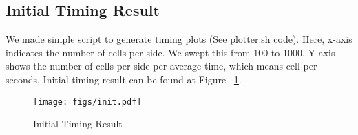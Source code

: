 \subsection{Initial Timing Result}
We made simple script to generate timing plots (See plotter.sh code). Here, x-axis indicates the number of cells per side. We swept this from 100 to 1000. Y-axis shows the number of cells per side per average time, which means cell per seconds. Initial timing result can be found at Figure ~\ref{fig:initial_timing_result}.

\begin{figure}[h]
    \centering
    \texttt{[image: figs/init.pdf]}
    \caption{Initial Timing Result}
    \label{fig:initial_timing_result}
\end{figure}